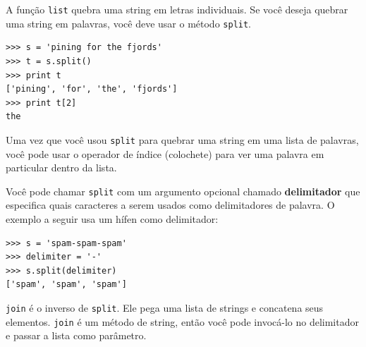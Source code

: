A função {\tt list} quebra uma string em letras individuais. Se você deseja quebrar
uma string em palavras, você deve usar o método {\tt split}.




\beforeverb
\begin{verbatim}
>>> s = 'pining for the fjords'
>>> t = s.split()
>>> print t
['pining', 'for', 'the', 'fjords']
>>> print t[2]
the
\end{verbatim}
\afterverb
%
Uma vez que você usou {\tt split} para quebrar uma string em uma lista
de palavras, você pode usar o operador de índice (colochete) para ver
uma palavra em particular dentro da lista.

Você pode chamar {\tt split} com um argumento opcional chamado {\bf delimitador}
que especifica quais caracteres a serem usados como delimitadores de palavra.
O exemplo a seguir usa um hífen como delimitador:




\beforeverb
\begin{verbatim}
>>> s = 'spam-spam-spam'
>>> delimiter = '-'
>>> s.split(delimiter)
['spam', 'spam', 'spam']
\end{verbatim}
\afterverb
%
{\tt join} é o inverso de {\tt split}. Ele pega uma lista de strings e
concatena seus elementos. {\tt join} é um método de string, então você pode invocá-lo
no delimitador e passar a lista como parâmetro.


